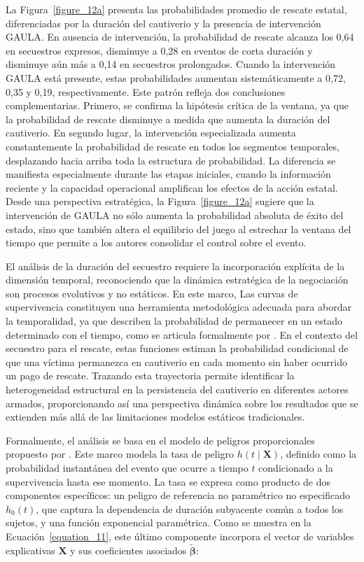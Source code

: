 \documentclass[12pt]{article}
\providecommand{\textcite}{\citet}
\theoremstyle{definition}
\theoremstyle{remark}
\newcommand{\1}{\mathbf{1}}
\begin{document}
La Figura~\ref{figure_12a} presenta las probabilidades promedio de rescate estatal, diferenciadas por la duración del cautiverio y la presencia de intervención GAULA. En ausencia de intervención, la probabilidad de rescate alcanza los 0,64 en secuestros expresos, disminuye a 0,28 en eventos de corta duración y disminuye aún más a 0,14 en secuestros prolongados. Cuando la intervención GAULA está presente, estas probabilidades aumentan sistemáticamente a 0,72, 0,35 y 0,19, respectivamente. Este patrón refleja dos conclusiones complementarias. Primero, se confirma la hipótesis crítica de la ventana, ya que la probabilidad de rescate disminuye a medida que aumenta la duración del cautiverio. En segundo lugar, la intervención especializada aumenta constantemente la probabilidad de rescate en todos los segmentos temporales, desplazando hacia arriba toda la estructura de probabilidad. La diferencia se manifiesta especialmente durante las etapas iniciales, cuando la información reciente y la capacidad operacional amplifican los efectos de la acción estatal. Desde una perspectiva estratégica, la Figura~\ref{figure_12a} sugiere que la intervención de GAULA no sólo aumenta la probabilidad absoluta de éxito del estado, sino que también altera el equilibrio del juego al estrechar la ventana del tiempo que permite a los autores consolidar el control sobre el evento.

El análisis de la duración del secuestro requiere la incorporación explícita de la dimensión temporal, reconociendo que la dinámica estratégica de la negociación son procesos evolutivos y no estáticos. En este marco, Las curvas de supervivencia constituyen una herramienta metodológica adecuada para abordar la temporalidad, ya que describen la probabilidad de permanecer en un estado determinado con el tiempo, como se articula formalmente por \textcite{Bradburn2003}. En el contexto del secuestro para el rescate, estas funciones estiman la probabilidad condicional de que una víctima permanezca en cautiverio en cada momento sin haber ocurrido un pago de rescate. Trazando esta trayectoria permite identificar la heterogeneidad estructural en la persistencia del cautiverio en diferentes actores armados, proporcionando así una perspectiva dinámica sobre los resultados que se extienden más allá de las limitaciones modelos estáticos tradicionales.


Formalmente, el análisis se basa en el modelo de peligros proporcionales propuesto por \textcite{Cox1972}. Este marco modela la tasa de peligro $h(t \mid \mathbf{X})$, definido como la probabilidad instantánea del evento que ocurre a tiempo $t$ condicionado a la supervivencia hasta ese momento. La tasa se expresa como producto de dos componentes específicos: un peligro de referencia no paramétrico no especificado $h_0(t)$, que captura la dependencia de duración subyacente común a todos los sujetos, y una función exponencial paramétrica. Como se muestra en la Ecuación~\ref{equation_11}, este último componente incorpora el vector de variables explicativas $\mathbf{X}$ y sus coeficientes asociados $\tilde{\boldsymbol{\beta}}$:
\end{document}
